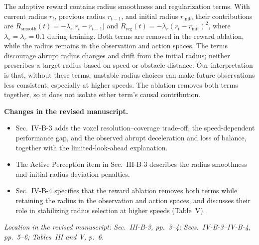 \documentclass[11pt]{article}
\newcommand{\Changes}{\par\noindent\textbf{Changes in the revised manuscript.}\ }
\newcommand{\Location}[1]{\par\noindent\textit{Location in the revised manuscript: #1}}
\begin{document}
The adaptive reward contains radius smoothness and regularization terms. With current radius $r_t$, previous radius $r_{t-1}$, and initial radius $r_{\mathrm{init}}$, their contributions are $R_{\mathrm{smooth}}(t)=-\lambda_s|r_t-r_{t-1}|$ and $R_{\mathrm{reg}}(t)=-\lambda_r(r_t-r_{\mathrm{init}})^2$, where $\lambda_s=\lambda_r=0.1$ during training. Both terms are removed in the reward ablation, while the radius remains in the observation and action spaces. The terms discourage abrupt radius changes and drift from the initial radius; neither prescribes a target radius based on speed or obstacle distance. Our interpretation is that, without these terms, unstable radius choices can make future observations less consistent, especially at higher speeds. The ablation removes both terms together, so it does not isolate either term's causal contribution.
\Changes
\begin{itemize}
    \item Sec.~IV-B-3 adds the voxel resolution--coverage trade-off, the speed-dependent performance gap, and the observed abrupt deceleration and loss of balance, together with the limited-look-ahead explanation.
    \item The Active Perception item in Sec.~III-B-3 describes the radius smoothness and initial-radius deviation penalties.
    \item Sec.~IV-B-4 specifies that the reward ablation removes both terms while retaining the radius in the observation and action spaces, and discusses their role in stabilizing radius selection at higher speeds (Table~V).
\end{itemize}
\Location{Sec.~III-B-3, pp.~3--4; Secs.~IV-B-3--IV-B-4, pp.~5--6; Tables~III and V, p.~6.}
\end{document}
